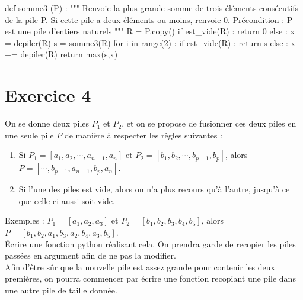 \ifprof
\begin{corrige}
\begin{python}
def somme3 (P) :
    """ Renvoie la plus grande somme de trois éléments consécutifs
    de la pile P.
    Si cette pile a deux éléments ou moins, renvoie 0.
    Précondition : P est une pile d'entiers naturels """
    R = P.copy()
    if est_vide(R) :
        return 0
    else :
        x = depiler(R)
        s = somme3(R)
        for i in range(2) :
            if est_vide(R) :
                return s
            else :
                x += depiler(R)
        return max(s,x)
	    
\end{python} 
\end{corrige}

\else \fi


\section*{Exercice 4}

\ifprof
\else
On se donne deux piles $P_1$ et $P_2$, et on se propose de fusionner ces deux piles en une seule pile $P$ de manière 
à respecter les règles suivantes :
\begin{enumerate}
\item Si $P_1=[a_1,a_2,\cdots,a_{n-1},a_n]$ et $P_2=[b_1,b_2,\cdots,b_{p-1},b_p]$, alors 
$P=[\cdots,b_{p-1},a_{n-1},b_p,a_n]$.
\item Si l'une des piles est vide, alors on n'a plus recours qu'à l'autre, jusqu'à ce que celle-ci aussi soit vide.
\end{enumerate}
Exemples : $P_1=[a_1,a_2,a_3]$ et $P_2=[b_1,b_2,b_3,b_4,b_5]$, alors $P=[b_1,b_2,a_1,b_3,a_2,b_4,a_3,b_5]$.\\

Écrire une fonction python réalisant cela. On prendra garde de recopier les piles passées en argument afin de ne pas la 
modifier.\\
Afin d'être sûr que la nouvelle pile est assez grande pour contenir les deux premières, on pourra commencer par écrire 
une fonction recopiant une pile dans une autre pile de taille donnée.
\fi

\ifprof

